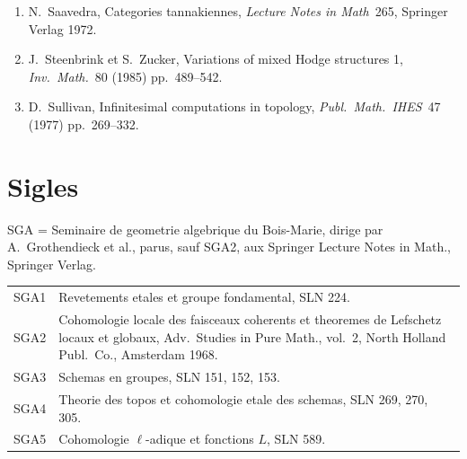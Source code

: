 \documentclass[12pt,a4paper]{article}
\theoremstyle{plain}
\theoremstyle{definition}
\theoremstyle{remark}
\begin{document}
\begin{enumerate}
\item[{[Sa]}] N.\ Saavedra, Categories tannakiennes, \textit{Lecture
Notes in Math}\ 265, Springer Verlag 1972.

\item[{[SZ]}] J.\ Steenbrink et S.\ Zucker, Variations of mixed Hodge
structures 1, \textit{Inv.\ Math.}\ 80 (1985) pp.\ 489--542.

\item[{[Su]}] D.\ Sullivan, Infinitesimal computations in topology,
\textit{Publ.\ Math.\ IHES}\ 47 (1977) pp.\ 269--332.
\end{enumerate}

\vspace{1cm}
\section*{Sigles}

SGA = Seminaire de geometrie algebrique du Bois-Marie, dirige par
A.\ Grothendieck et al., parus, sauf SGA2, aux Springer Lecture Notes
in Math., Springer Verlag.

\begin{tabular}{ll}
SGA1 & Revetements etales et groupe fondamental, SLN 224. \\
SGA2 & Cohomologie locale des faisceaux coherents et theoremes de
Lefschetz locaux et globaux, Adv.\ Studies in Pure Math., vol.\ 2,
North Holland Publ.\ Co., Amsterdam 1968. \\
SGA3 & Schemas en groupes, SLN 151, 152, 153. \\
SGA4 & Theorie des topos et cohomologie etale des schemas, SLN 269,
270, 305. \\
SGA5 & Cohomologie $\ell$-adique et fonctions $L$, SLN 589.
\end{tabular}
\end{document}
